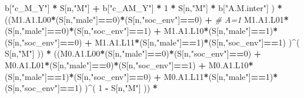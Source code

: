 \documentclass[
]{book}
\newenvironment{Shaded}{\begin{snugshade}}{\end{snugshade}}
\newcommand{\CommentTok}[1]{\textcolor[rgb]{0.56,0.35,0.01}{\textit{#1}}}
\newcommand{\DecValTok}[1]{\textcolor[rgb]{0.00,0.00,0.81}{#1}}
\newcommand{\NormalTok}[1]{#1}
\newcommand{\SpecialCharTok}[1]{\textcolor[rgb]{0.81,0.36,0.00}{\textbf{#1}}}
\newcommand{\StringTok}[1]{\textcolor[rgb]{0.31,0.60,0.02}{#1}}
\begin{document}
\begin{Shaded}
\begin{Highlighting}[]
\NormalTok{                             b[}\StringTok{"c\_M\_Y"}\NormalTok{] }\SpecialCharTok{*}\NormalTok{ S[n,}\StringTok{"M"}\NormalTok{] }\SpecialCharTok{+}
\NormalTok{                             b[}\StringTok{"c\_AM\_Y"}\NormalTok{] }\SpecialCharTok{*} \DecValTok{1} \SpecialCharTok{*}\NormalTok{ S[n,}\StringTok{"M"}\NormalTok{] }\SpecialCharTok{*}\NormalTok{ b[}\StringTok{"A.M.inter"}\NormalTok{] ) }\SpecialCharTok{*}
\NormalTok{      ((M1.A1.L00}\SpecialCharTok{*}\NormalTok{(S[n,}\StringTok{"male"}\NormalTok{]}\SpecialCharTok{==}\DecValTok{0}\NormalTok{)}\SpecialCharTok{*}\NormalTok{(S[n,}\StringTok{"soc\_env"}\NormalTok{]}\SpecialCharTok{==}\DecValTok{0}\NormalTok{) }\SpecialCharTok{+}                    \CommentTok{\# A\textquotesingle{}=1}
\NormalTok{          M1.A1.L01}\SpecialCharTok{*}\NormalTok{(S[n,}\StringTok{"male"}\NormalTok{]}\SpecialCharTok{==}\DecValTok{0}\NormalTok{)}\SpecialCharTok{*}\NormalTok{(S[n,}\StringTok{"soc\_env"}\NormalTok{]}\SpecialCharTok{==}\DecValTok{1}\NormalTok{) }\SpecialCharTok{+}
\NormalTok{          M1.A1.L10}\SpecialCharTok{*}\NormalTok{(S[n,}\StringTok{"male"}\NormalTok{]}\SpecialCharTok{==}\DecValTok{1}\NormalTok{)}\SpecialCharTok{*}\NormalTok{(S[n,}\StringTok{"soc\_env"}\NormalTok{]}\SpecialCharTok{==}\DecValTok{0}\NormalTok{) }\SpecialCharTok{+} 
\NormalTok{          M1.A1.L11}\SpecialCharTok{*}\NormalTok{(S[n,}\StringTok{"male"}\NormalTok{]}\SpecialCharTok{==}\DecValTok{1}\NormalTok{)}\SpecialCharTok{*}\NormalTok{(S[n,}\StringTok{"soc\_env"}\NormalTok{]}\SpecialCharTok{==}\DecValTok{1}\NormalTok{) )}\SpecialCharTok{\^{}}\NormalTok{( S[n,}\StringTok{"M"}\NormalTok{] )) }\SpecialCharTok{*}
\NormalTok{      ((M0.A1.L00}\SpecialCharTok{*}\NormalTok{(S[n,}\StringTok{"male"}\NormalTok{]}\SpecialCharTok{==}\DecValTok{0}\NormalTok{)}\SpecialCharTok{*}\NormalTok{(S[n,}\StringTok{"soc\_env"}\NormalTok{]}\SpecialCharTok{==}\DecValTok{0}\NormalTok{) }\SpecialCharTok{+}                
\NormalTok{          M0.A1.L01}\SpecialCharTok{*}\NormalTok{(S[n,}\StringTok{"male"}\NormalTok{]}\SpecialCharTok{==}\DecValTok{0}\NormalTok{)}\SpecialCharTok{*}\NormalTok{(S[n,}\StringTok{"soc\_env"}\NormalTok{]}\SpecialCharTok{==}\DecValTok{1}\NormalTok{) }\SpecialCharTok{+}
\NormalTok{          M0.A1.L10}\SpecialCharTok{*}\NormalTok{(S[n,}\StringTok{"male"}\NormalTok{]}\SpecialCharTok{==}\DecValTok{1}\NormalTok{)}\SpecialCharTok{*}\NormalTok{(S[n,}\StringTok{"soc\_env"}\NormalTok{]}\SpecialCharTok{==}\DecValTok{0}\NormalTok{) }\SpecialCharTok{+} 
\NormalTok{          M0.A1.L11}\SpecialCharTok{*}\NormalTok{(S[n,}\StringTok{"male"}\NormalTok{]}\SpecialCharTok{==}\DecValTok{1}\NormalTok{)}\SpecialCharTok{*}\NormalTok{(S[n,}\StringTok{"soc\_env"}\NormalTok{]}\SpecialCharTok{==}\DecValTok{1}\NormalTok{) )}\SpecialCharTok{\^{}}\NormalTok{( }\DecValTok{1} \SpecialCharTok{{-}}\NormalTok{ S[n,}\StringTok{"M"}\NormalTok{] )) }\SpecialCharTok{*}

\end{Highlighting}
\end{Shaded}
\end{document}
